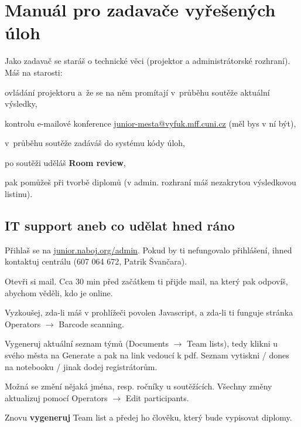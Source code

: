 \documentclass[vyfuk,\classoptions]{fksempty}
\begin{document}
\section{Manuál pro zadavače vyřešených úloh}

\noindent
Jako zadavač se staráš o technické věci (projektor a administrátorské
rozhraní). Máš na starosti:

\begin{compactitem}
	\item ovládání projektoru a~že se na něm promítají v~průběhu soutěže aktuální výsledky,
	\item kontrolu e-mailové konference \url{junior-mesta@vyfuk.mff.cuni.cz} (měl bys v ní být),
	\item v~průběhu soutěže zadáváš do systému kódy úloh,
	\item po soutěži uděláš \textbf{Room review},
	\item pak pomůžeš při tvorbě diplomů (v admin. rozhraní máš nezakrytou výsledkovou listinu).
\end{compactitem}

\medskip

\subsection{IT support aneb co udělat hned ráno}
\begin{compactenum}
	\item Přihlaš se na \url{junior.naboj.org/admin}. Pokud by ti nefungovalo
přihlášení, ihned kontaktuj centrálu (607 064 672, Patrik Švančara).
	\item Otevři si mail. Cca 30 min před začátkem ti přijde mail, na který pak odpovíš, abychom věděli, kdo je online.
	\item Vyzkoušej, zda-li máš v prohlížeči povolen Javascript, a zda-li ti funguje stránka Operators $\rightarrow$ Barcode scanning.
	\item Vygeneruj aktuální seznam týmů (Documents $\rightarrow$ Team lists),
tedy klikni u svého města na Generate a pak na link vedoucí k pdf. Seznam
vytiskni / dones na notebooku / jinak dodej registrátorům.
	\item Možná se změní nějaká jména, resp. ročníky u soutěžících.
Všechny změny aktualizuj pomocí Operators $\rightarrow$ Edit participants.
	\item Znovu {\bf vygeneruj} Team list a předej ho člověku, který bude
vypisovat diplomy.
\end{compactenum}
\end{document}
